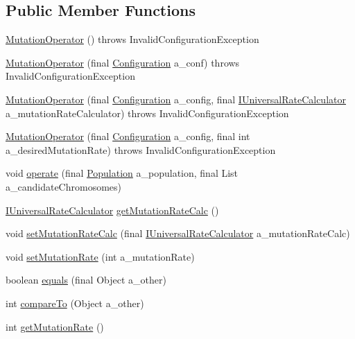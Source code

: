 \subsection*{Public Member Functions}
\begin{DoxyCompactItemize}
\item 
\hyperlink{classorg_1_1jgap_1_1impl_1_1_mutation_operator_a70ee0430f18e07c0cbdcdc3370da013a}{Mutation\-Operator} ()  throws Invalid\-Configuration\-Exception 
\item 
\hyperlink{classorg_1_1jgap_1_1impl_1_1_mutation_operator_ab7a875f7a9c62a2fa4ba3ace00bbe0ee}{Mutation\-Operator} (final \hyperlink{classorg_1_1jgap_1_1_configuration}{Configuration} a\-\_\-conf)  throws Invalid\-Configuration\-Exception 
\item 
\hyperlink{classorg_1_1jgap_1_1impl_1_1_mutation_operator_aefd976178a75cd5641929533c367d39c}{Mutation\-Operator} (final \hyperlink{classorg_1_1jgap_1_1_configuration}{Configuration} a\-\_\-config, final \hyperlink{interfaceorg_1_1jgap_1_1_i_universal_rate_calculator}{I\-Universal\-Rate\-Calculator} a\-\_\-mutation\-Rate\-Calculator)  throws Invalid\-Configuration\-Exception 
\item 
\hyperlink{classorg_1_1jgap_1_1impl_1_1_mutation_operator_abdacf3ee2ef8a6f544af2424f9682ec8}{Mutation\-Operator} (final \hyperlink{classorg_1_1jgap_1_1_configuration}{Configuration} a\-\_\-config, final int a\-\_\-desired\-Mutation\-Rate)  throws Invalid\-Configuration\-Exception 
\item 
void \hyperlink{classorg_1_1jgap_1_1impl_1_1_mutation_operator_a4a1c852770559bba4ffa3e9718f4a0d8}{operate} (final \hyperlink{classorg_1_1jgap_1_1_population}{Population} a\-\_\-population, final List a\-\_\-candidate\-Chromosomes)
\item 
\hyperlink{interfaceorg_1_1jgap_1_1_i_universal_rate_calculator}{I\-Universal\-Rate\-Calculator} \hyperlink{classorg_1_1jgap_1_1impl_1_1_mutation_operator_a4e61256bfd2fd9db20cb7839970ce2b1}{get\-Mutation\-Rate\-Calc} ()
\item 
void \hyperlink{classorg_1_1jgap_1_1impl_1_1_mutation_operator_a1ba32ba71ff16141bb7c9f6c3a0a8865}{set\-Mutation\-Rate\-Calc} (final \hyperlink{interfaceorg_1_1jgap_1_1_i_universal_rate_calculator}{I\-Universal\-Rate\-Calculator} a\-\_\-mutation\-Rate\-Calc)
\item 
void \hyperlink{classorg_1_1jgap_1_1impl_1_1_mutation_operator_a8aecc7650a9743a737dac2d5ed782f87}{set\-Mutation\-Rate} (int a\-\_\-mutation\-Rate)
\item 
boolean \hyperlink{classorg_1_1jgap_1_1impl_1_1_mutation_operator_abf3ab580f3f5755f8dfc0cdfabe18530}{equals} (final Object a\-\_\-other)
\item 
int \hyperlink{classorg_1_1jgap_1_1impl_1_1_mutation_operator_a0a45fadb8c98c2654220f42317286e43}{compare\-To} (Object a\-\_\-other)
\item 
int \hyperlink{classorg_1_1jgap_1_1impl_1_1_mutation_operator_a4c2e6670fc376734386d37e918071410}{get\-Mutation\-Rate} ()
\end{DoxyCompactItemize}
